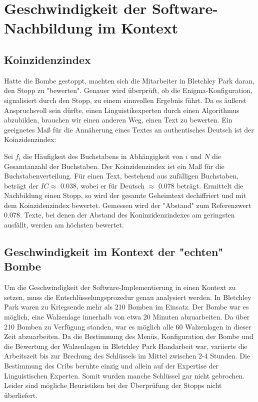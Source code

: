 \chapter{Geschwindigkeit der Software-Nachbildung im Kontext}\label{ch:speed}

\section{Koinzidenzindex}\label{sec:koinzidenzindex}
Hatte die Bombe gestoppt, machten sich die Mitarbeiter in Bletchley Park daran, den Stopp zu "bewerten". 
Genauer wird überprüft, ob die Enigma-Konfiguration, signalisiert durch den Stopp, zu einem sinnvollen Ergebnis führt.
Da es äußerst Anspruchsvoll sein dürfte, einen Linguistikexperten durch einen Algorithmus abzubilden, brauchen wir einen anderen Weg, einen Text zu bewerten.
Ein geeignetes Maß für die Annäherung eines Textes an authentisches Deutsch ist der Koinzidenzindex:

	
	
Sei $f_i$ die Häufigkeit des Buchstabens in Abhängigkeit von $i$ und $N$ die Gesamtanzahl der Buchstaben.
Der Koinzidenzindex ist ein Maß für die Buchstabenverteilung.
Für einen Text, bestehend aus zufälligen Buchstaben, beträgt der $IC \approx$ 0.038, wobei er für Deutsch $\approx$ 0.078 beträgt.
Ermittelt die Nachbildung einen Stopp, so wird der gesamte Geheimtext dechiffriert und mit dem Koinzidenzindex bewertet.
Gemessen wird der "Abstand" zum Referenzwert 0.078.
Texte, bei denen der Abstand des Koninzidenzindexes am geringsten ausfällt, werden am höchsten bewertet.


\section{Geschwindigkeit im Kontext der "echten" Bombe}\label{sec:speed}
Um die Geschwindigkeit der Software-Implementierung in einen Kontext zu setzen, muss die Entschlüsselungsprozedur genau analysiert werden.
In Bletchley Park waren zu Kriegsende mehr als 210 Bomben im Einsatz.
Der Bombe war es möglich, eine Walzenlage innerhalb von etwa 20 Minuten abzuarbeiten.
Da über 210 Bomben zu Verfügung standen, war es möglich alle 60 Walzenlagen in dieser Zeit abzuarbeiten.
Da die Bestimmung des Menüs, Konfiguration der Bombe und die Bewertung der Walzenlagen in Bletchley Park Handarbeit war, variierte die Arbeitszeit bis zur Brechung des Schlüssels im Mittel zwischen 2-4 Stunden.
Die Bestimmung des Cribs beruhte einzig und allein auf der Expertise der Linguistischen Experten. 
Somit wurden manche Schlüssel gar nicht gebrochen.
Leider sind mögliche Heuristiken bei der Überprüfung der Stopps nicht überliefert.

